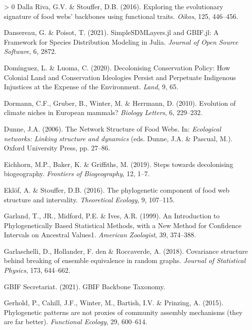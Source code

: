 \documentclass[11pt]{article}
\newlength{\cslhangindent}
\newenvironment{CSLReferences}[3] %
 {%
  \setlength{\parindent}{0pt}
  \ifodd #1 \everypar{\setlength{\hangindent}{\cslhangindent}}\ignorespaces\fi
  \ifnum #2 > 0
  \setlength{\parskip}{#2\baselineskip}
  \fi
 }%
 {}
\begin{document}
\begin{CSLReferences}{1}{0}
\leavevmode\hypertarget{ref-DallaRiva2016ExpEvo}{}%
Dalla Riva, G.V. \& Stouffer, D.B. (2016). Exploring the evolutionary
signature of food webs' backbones using functional traits. \emph{Oikos},
125, 446--456.

\leavevmode\hypertarget{ref-Dansereau2021SimJl}{}%
Dansereau, G. \& Poisot, T. (2021). SimpleSDMLayers.jl and GBIF.jl: A
Framework for Species Distribution Modeling in Julia. \emph{Journal of
Open Source Software}, 6, 2872.

\leavevmode\hypertarget{ref-Dominguez2020DecCon}{}%
Domínguez, L. \& Luoma, C. (2020). Decolonising Conservation Policy: How
Colonial Land and Conservation Ideologies Persist and Perpetuate
Indigenous Injustices at the Expense of the Environment. \emph{Land}, 9,
65.

\leavevmode\hypertarget{ref-Dormann2010EvoCli}{}%
Dormann, C.F., Gruber, B., Winter, M. \& Herrmann, D. (2010). Evolution
of climate niches in European mammals? \emph{Biology Letters}, 6,
229--232.

\leavevmode\hypertarget{ref-Dunne2006NetStr}{}%
Dunne, J.A. (2006). The Network Structure of Food Webs. In:
\emph{Ecological networks: Linking structure and dynamics} (eds. Dunne,
J.A. \& Pascual, M.). Oxford University Press, pp. 27--86.

\leavevmode\hypertarget{ref-Eichhorn2019SteDec}{}%
Eichhorn, M.P., Baker, K. \& Griffiths, M. (2019). Steps towards
decolonising biogeography. \emph{Frontiers of Biogeography}, 12, 1--7.

\leavevmode\hypertarget{ref-Eklof2016PhyCom}{}%
Eklöf, A. \& Stouffer, D.B. (2016). The phylogenetic component of food
web structure and intervality. \emph{Theoretical Ecology}, 9, 107--115.

\leavevmode\hypertarget{ref-Garland1999IntPhy}{}%
Garland, T., JR., Midford, P.E. \& Ives, A.R. (1999). An Introduction to
Phylogenetically Based Statistical Methods, with a New Method for
Confidence Intervals on Ancestral Values1. \emph{American Zoologist},
39, 374--388.

\leavevmode\hypertarget{ref-Garlaschelli2018CovStr}{}%
Garlaschelli, D., Hollander, F. den \& Roccaverde, A. (2018). Covariance
structure behind breaking of ensemble equivalence in random graphs.
\emph{Journal of Statistical Physics}, 173, 644--662.

\leavevmode\hypertarget{ref-GBIFSecretariat2021GbiBac}{}%
GBIF Secretariat. (2021). GBIF Backbone Taxonomy.

\leavevmode\hypertarget{ref-Gerhold2015PhyPat}{}%
Gerhold, P., Cahill, J.F., Winter, M., Bartish, I.V. \& Prinzing, A.
(2015). Phylogenetic patterns are not proxies of community assembly
mechanisms (they are far better). \emph{Functional Ecology}, 29,
600--614.


\end{CSLReferences}
\end{document}
